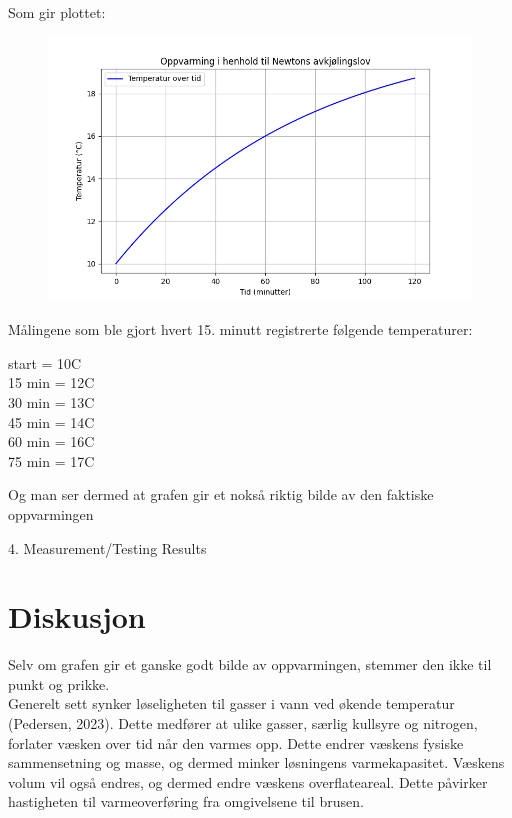 \documentclass[a4paper,12pt]{article}
\begin{document}
Som gir plottet:

\begin{figure}[h]
    \centering
    \includegraphics[width=1.0\linewidth]{Figure_1.png}
    
    \label{fig:Oppvarming i henhold til newtons avkjølingslov}
\end{figure}

Målingene som ble gjort hvert 15. minutt registrerte følgende temperaturer: 
\begin{itemize}
start = 10C
\\
15 min = 12C
\\
30 min = 13C
\\
45 min = 14C
\\
60 min = 16C
\\
75 min = 17C
\end{itemize}
Og man ser dermed at grafen gir et nokså riktig bilde av den faktiske oppvarmingen




4. Measurement/Testing Results
\newpage
\section{Diskusjon}
Selv om grafen gir et ganske godt bilde av oppvarmingen, stemmer den ikke til punkt og prikke. \\

Generelt sett synker løseligheten til gasser i vann ved økende temperatur (Pedersen, 2023). Dette medfører at ulike gasser, særlig kullsyre og nitrogen, forlater væsken over tid når den varmes opp. Dette endrer væskens fysiske sammensetning og masse, og dermed minker løsningens varmekapasitet. Væskens volum vil også endres, og dermed endre væskens overflateareal. Dette påvirker hastigheten til varmeoverføring fra omgivelsene til brusen.\\
\end{document}

